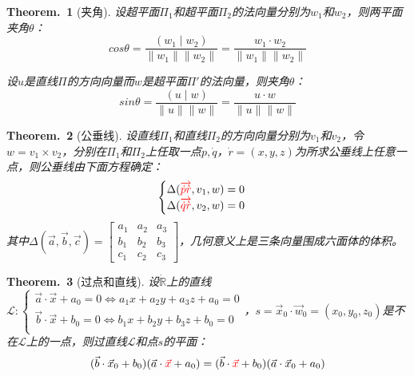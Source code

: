 \documentclass[zihao=5,UTF8]{report}
\def\R{\mathbb{R}}
\theoremstyle{mystyle} %
\newtheorem{theorem}{Theorem.\,}
\begin{document}
\begin{theorem}[夹角]\label{夹角}
设超平面$\Pi_1$和超平面$\Pi_2$的法向量分别为$w_1$和$w_2$，则两平面夹角$\theta$：
\begin{equation*}
    cos \theta = \frac{(w_1\mid w_2)}{\|w_1\|\|w_2\|} = \frac{w_1\cdot w_2}{\|w_1\|\|w_2\|}
\end{equation*}

设$u$是直线$\Pi$的方向向量而$w$是超平面$\Pi'$的法向量，则夹角$\theta$：
\begin{equation*}
    sin \theta = \frac{(u\mid w)}{\|u\|\|w\|} = \frac{u\cdot w}{\|u\|\|w\|}
\end{equation*}

\end{theorem}

\begin{theorem}[公垂线]\label{公垂线}
设直线$\Pi_1$和直线$\Pi_2$的方向向量分别为$v_1$和$v_2$，令$w=v_1\times v_2$，分别在$\Pi_1$和$\Pi_2$上任取一点$\dot{p}, \dot{q}$，$\dot{r} = (x,y,z)$为所求公垂线上任意一点，则公垂线由下面方程确定：
\begin{equation*}
    \begin{cases}
        \Delta ({\color{red}\overrightarrow{\dot{p}\dot{r}}},v_1,w)=0 \\
        \Delta ({\color{red}\overrightarrow{\dot{q}\dot{r}}},v_2,w)=0 \\
    \end{cases}
\end{equation*}
其中$\Delta(\vec{a}, \vec{b}, \vec{c}) = 
\begin{bmatrix}  
    a_1 & a_2 & a_3 \\  
    b_1 & b_2 & b_3 \\  
    c_1 & c_2 & c_3 
\end{bmatrix}$，几何意义上是三条向量围成六面体的体积。
\end{theorem}

\begin{theorem}[过点和直线]\label{过点和直线}
设$\dot{\R}$上的直线$\mathscr{L}:\begin{cases}
    \vec{a}\cdot\vec{x}+a_0=0\Longleftrightarrow a_1x+a_2y+a_3z+a_0=0 \\
    \vec{b}\cdot\vec{x}+b_0=0\Longleftrightarrow b_1x+b_2y+b_3z+b_0=0 \\
\end{cases} $，$s=\vec{x}_0\cdot\vec{w}_0 = (x_0,y_0,z_0)$是不在$\mathscr{L}$上的一点，则过直线$\mathscr{L}$和点$s$的平面：
\begin{equation*}
    (\vec{b}\cdot\vec{x}_0+b_0)(\vec{a}\cdot{\color{red}\vec{x}}+a_0)=(\vec{b}\cdot{\color{red}\vec{x}}+b_0)(\vec{a}\cdot\vec{x}_0+a_0)
\end{equation*}

\end{theorem}
\end{document}
